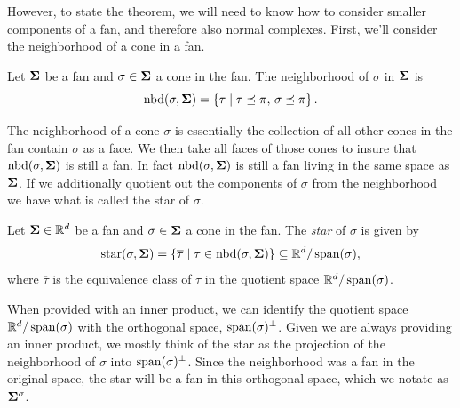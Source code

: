 \documentclass[12pt,oneside]{../../sfsuthesis}
\begin{document}
However, to state the theorem, we will need to know how to consider smaller components of a fan, and therefore also normal complexes.
First, we'll consider the neighborhood of a cone in a fan.
\begin{definition}[Neighborhood]\th\label{def:nbr}
    Let \( \bm{\Sigma} \) be a fan and \( \sigma \in \bm{\Sigma} \) a cone in the fan.
    The neighborhood of \( \sigma \) in \( \bm{\Sigma} \) is
    \[
        \operatorname{nbd}(\sigma, \bm{\Sigma}) = \left\{ \tau \; \middle| \; \tau \preceq \pi, \, \sigma \preceq \pi \right\}.
    \]
\end{definition}
The neighborhood of a cone \( \sigma \) is essentially the collection of all other cones in the fan contain \( \sigma \) as a face.
We then take all faces of those cones to insure that \( \operatorname{nbd}(\sigma, \bm{\Sigma}) \) is still a fan.
In fact \( \operatorname{nbd}(\sigma, \bm{\Sigma}) \) is still a fan living in the same space as \( \bm{\Sigma} \).
If we additionally quotient out the components of \( \sigma \) from the neighborhood we have what is called the star of \( \sigma \).
\begin{definition}[Star]\th\label{def:star}
    Let \( \bm{\Sigma} \in \mathbb{R}^d\) be a fan and \( \sigma \in \bm{\Sigma} \) a cone in the fan.
    The \emph{star} of \( \sigma \) is given by
    \[
        \operatorname{star}(\sigma, \bm{\Sigma}) = \left\{ \overline{\tau} \; \middle| \; \tau \in \operatorname{nbd}(\sigma, \bm{\Sigma}) \right\} \subseteq \mathbb{R}^d / \operatorname{span}(\sigma),
    \]
    where \( \overline{\tau} \) is the equivalence class of \( \tau \) in the quotient space \( \mathbb{R}^d / \operatorname{span}(\sigma) \).
\end{definition}
When provided with an inner product, we can identify the quotient space \( \mathbb{R}^d / \operatorname{span}(\sigma)\) with the orthogonal space, \( \operatorname{span}(\sigma)^\bot \).
Given we are always providing an inner product, we mostly think of the star as the projection of the neighborhood of \( \sigma \) into \( \operatorname{span}(\sigma)^\bot \).
Since the neighborhood was a fan in the original space, the star will be a fan in this orthogonal space, which we notate as  \( \bm{\Sigma}^{\sigma} \).
\end{document}
